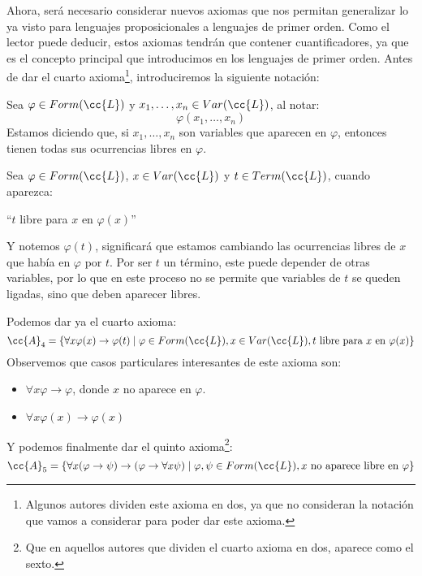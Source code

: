 Ahora, será necesario considerar nuevos axiomas que nos permitan generalizar lo ya visto para lenguajes proposicionales a lenguajes de primer orden. Como el lector puede deducir, estos axiomas tendrán que contener cuantificadores, ya que es el concepto principal que introducimos en los lenguajes de primer orden. Antes de dar el cuarto axioma\footnote{Algunos autores dividen este axioma en dos, ya que no consideran la notación que vamos a considerar para poder dar este axioma.}, introduciremos la siguiente notación:

\begin{notacion}
    Sea $\varphi \in Form(\cc{L})$ y $x_1,\ldots,x_n \in Var(\cc{L})$, al notar:
    \begin{equation*}
        \varphi(x_1,\ldots,x_n)
    \end{equation*}
    Estamos diciendo que, si $x_1,\ldots,x_n$ son variables que aparecen en $\varphi$, entonces tienen todas sus ocurrencias libres en $\varphi$.
\end{notacion}

\begin{notacion}
    Sea $\varphi \in Form(\cc{L})$, $x\in Var(\cc{L})$ y $t\in Term(\cc{L})$, cuando aparezca:
    \begin{center}
        ``$t$ libre para $x$ en $\varphi(x)$''
    \end{center}
    Y notemos $\varphi(t)$, significará que estamos cambiando las ocurrencias libres de $x$ que había en $\varphi$ por $t$. Por ser $t$ un término, este puede depender de otras variables, por lo que en este proceso no se permite que variables de $t$ se queden ligadas, sino que deben aparecer libres.
\end{notacion}
Podemos dar ya el cuarto axioma:
\begin{equation*}
    \cc{A}_4 = \{\forall x\varphi(x)\to\varphi(t) \mid \varphi \in Form(\cc{L}), x\in Var(\cc{L}), t \text{\ libre para\ } x \text{\ en\ } \varphi(x)\}
\end{equation*}
Observemos que casos particulares interesantes de este axioma son:
\begin{itemize}
    \item $\forall x\varphi \to \varphi$, donde $x$ no aparece en $\varphi$.
    \item $\forall x\varphi(x)\to \varphi(x)$
\end{itemize}

Y podemos finalmente dar el quinto axioma\footnote{Que en aquellos autores que dividen el cuarto axioma en dos, aparece como el sexto.}:
\begin{equation*}
    \cc{A}_5 = \{\forall x(\varphi\to\psi)\to(\varphi\to\forall x\psi) \mid \varphi,\psi \in Form(\cc{L}), x \text{\ no aparece libre en\ } \varphi\}
\end{equation*}

